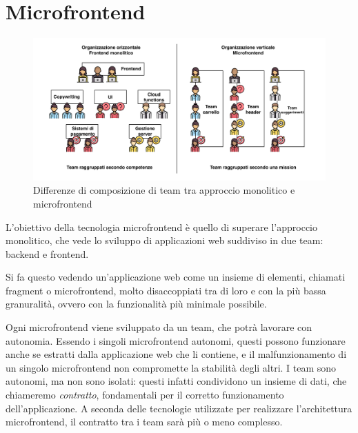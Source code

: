 \chapter{Microfrontend}\label{ch:chapter1}
\begin{figure}[H]
  \centering
  \includegraphics[width=140mm]{img/schema_microfrontend}
  \caption{Differenze di composizione di team tra approccio monolitico e microfrontend}
\end{figure}
L'obiettivo della tecnologia microfrontend è quello di superare l'approccio monolitico, che vede
lo sviluppo di applicazioni web suddiviso in due team: backend e frontend.

Si fa questo vedendo un'applicazione web come un insieme
di elementi, chiamati fragment o microfrontend, molto disaccoppiati tra di loro
e con la più bassa granuralità, ovvero con la funzionalità più minimale possibile.

Ogni microfrontend viene sviluppato da un team, che potrà lavorare con autonomia. 
Essendo i singoli microfrontend autonomi,
questi possono funzionare anche se estratti dalla applicazione web che li contiene,
 e il malfunzionamento di un singolo microfrontend
non compromette la stabilità degli altri.
I team sono autonomi, ma non sono isolati: questi infatti condividono un insieme di dati, che
chiameremo \emph{contratto},
fondamentali per il corretto funzionamento dell'applicazione. A seconda delle tecnologie utilizzate
per realizzare l'architettura microfrontend, il contratto tra i team sarà più o meno complesso.



